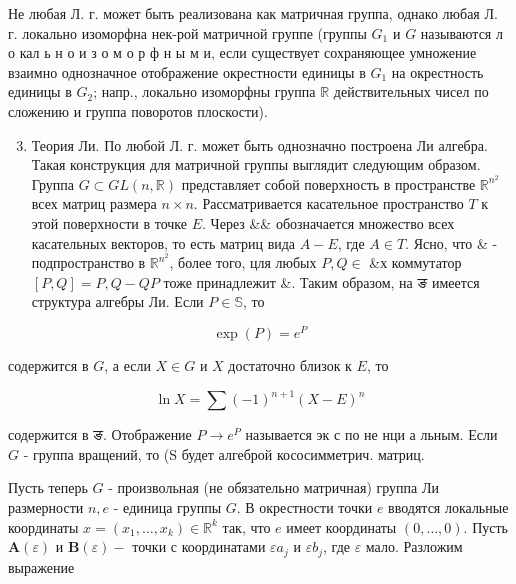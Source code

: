 \documentclass[10pt]{article}
\begin{document}
Не любая Л. г. может быть реализована как матричная группа, однако любая Л. г. локально изоморфна нек-рой матричной группе (группы $G_{1}$ и $G$ называются л о кал ь н о и з о м о р ф н ы м и, если существует сохраняющее умножение взаимно однозначное отображение окрестности единицы в $G_{1}$ на окрестность единицы в $G_{2}$; напр., локально изоморфны группа $\mathbb{R}$ действительных чисел по сложению и группа поворотов плоскости).



\begin{enumerate}

  \setcounter{enumi}{2}

  \item Теория Ли. По любой Л. г. может быть однозначно построена Ли алгебра. Такая конструкция для матричной группы выглядит следующим образом. Группа $G \subset G L(n, \mathbb{R})$ представляет собой поверхность в пространстве $\mathbb{R}^{n^{2}}$ всех матриц размера $n \times n$. Рассматривается касательное пространство $T$ к этой поверхности в точке $E$. Через \&\& обозначается множество всех касательных векторов, то есть матриц вида $A-E$, где $A \in T$. Ясно, что \& - подпространство в $\mathbb{R}^{n^{2}}$, более того, цля любых $P, Q \in$ \&х коммутатор $[P, Q]=P, Q-Q P$ тоже принадлежит \&. Таким образом, на ङ имеется структура алгебры Ли. Если $P \in \mathbb{S}$, то

\end{enumerate}



\[

\exp (P)=e^{P}

\]



содержится в $G$, а если $X \in G$ и $X$ достаточно близок к $E$, то



\[

\ln X=\sum(-1)^{n+1}(X-E)^{n}

\]



содержится в ङ. Отображение $P \rightarrow e^{P}$ называется эк с по не нци а льным. Если $G$ - группа вращений, то (S будет алгеброй кососимметрич. матриц.



Пусть теперь $G$ - произвольная (не обязательно матричная) группа Ли размерности $n, e$ - единица группы $G$. В окрестности точки $e$ вводятся локальные координаты $x=\left(x_{1}, \ldots, x_{k}\right) \in \mathbb{R}^{k}$ так, что $e$ имеет координаты $(0, \ldots, 0)$. Пусть $\boldsymbol{A}(\varepsilon)$ и $\boldsymbol{B}(\varepsilon)-$ точки с координатами $\varepsilon a_{j}$ и $\varepsilon b_{j}$, где $\varepsilon$ мало. Разложим выражение
\end{document}

